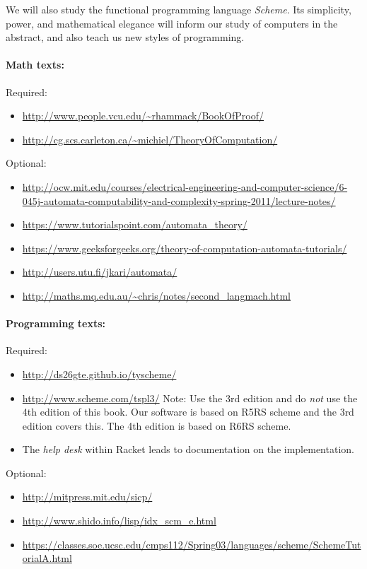\documentclass{article}
\begin{document}
We will also study the functional programming language {\em Scheme}.
Its simplicity, power, and mathematical elegance will inform our
study of computers in the abstract, and also teach us new styles of
programming.


\paragraph{Math texts:} \mbox{}

Required:
\begin{itemize}
\item \url{http://www.people.vcu.edu/~rhammack/BookOfProof/}
\item \url{http://cg.scs.carleton.ca/~michiel/TheoryOfComputation/}
\end{itemize}
Optional:
\begin{itemize}
\item {\tiny \url{http://ocw.mit.edu/courses/electrical-engineering-and-computer-science/6-045j-automata-computability-and-complexity-spring-2011/lecture-notes/}}
\item
  \url{https://www.tutorialspoint.com/automata_theory/}
\item
  \url{https://www.geeksforgeeks.org/theory-of-computation-automata-tutorials/}
\item
  \url{http://users.utu.fi/jkari/automata/}
\item
  \url{http://maths.mq.edu.au/~chris/notes/second_langmach.html}
\end{itemize} 
\paragraph{Programming texts:} \mbox{}

Required:
\begin{itemize}
\item
      \url{http://ds26gte.github.io/tyscheme/} 
    \item
      \url{http://www.scheme.com/tspl3/}  Note: Use the 3rd edition
      and do {\em not} use the
      4th edition of this book.  Our software is based on R5RS scheme and
      the 3rd edition covers this.  The 4th edition is based on R6RS scheme.
    \item
      The {\em help desk} within Racket leads to documentation on
      the implementation.
\end{itemize}
Optional:
\begin{itemize}
\item
  \url{http://mitpress.mit.edu/sicp/}
\item
  \url{http://www.shido.info/lisp/idx_scm_e.html}
\item
  \url{https://classes.soe.ucsc.edu/cmps112/Spring03/languages/scheme/SchemeTutorialA.html}
\end{itemize}
\end{document}
